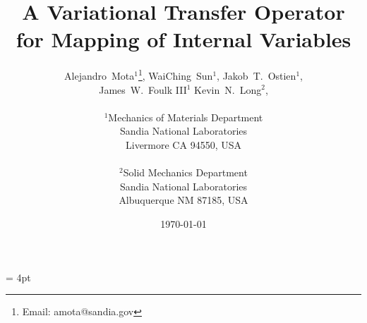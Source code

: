 \documentclass[12pt]{article}
\begin{document}
\setlength{\headheight}{15pt}
\headsep = 4pt
\pagestyle{fancyplain}




\title{A Variational Transfer Operator for Mapping of Internal
Variables}

\author{
  \Large
  Alejandro~Mota$^1$\thanks{Email: amota@sandia.gov},
  WaiChing~Sun$^1$,
  Jakob~T.~Ostien$^1$,
  \\
  \Large
  James~W.~Foulk {III}$^1$
  Kevin~N.~Long$^2$,
  \\
  \\
  $^1$Mechanics of Materials Department\\
  Sandia National Laboratories\\
  Livermore CA 94550, USA\\
  \\
  $^2$Solid Mechanics Department\\
  Sandia National Laboratories\\
  Albuquerque NM 87185, USA\\
}

\date{\today}

\maketitle
\end{document}
